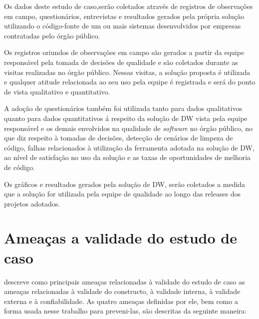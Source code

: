 Os dados deste estudo de caso,serão coletados através de registros de observações em campo, questionários, entrevistas e resultados gerados pela própria solução utilizando o código-fonte de um ou mais sistemas desenvolvidos por empresas contratadas pelo órgão público.

Os registros oriundos de observações em campo são gerados a partir da equipe responsável pela tomada de decisões de qualidade e são coletados durante as visitas realizadas no órgão público. Nessas visitas, a solução proposta é utilizada e qualquer atitude relacionada ao seu uso pela equipe é registrada e será do ponto de vista qualitativo e quantitativo.

A adoção de questionários também foi utilizada tanto para dados qualitativos quanto para dados quantitativos á respeito da solução de DW vista pela equipe responsável e os demais envolvidos na qualidade de \textit{software} no órgão público, no que diz respeito à tomadas de decisões, detecção de cenários de limpeza de código, falhas relacionados à utilização da ferramenta adotada na solução de DW, ao nível de satisfação no uso da solução e as taxas de oportunidades de melhoria de código. 

Os gráficos e resultados gerados pela solução de DW, serão coletados a medida que a solução for utilizada pela equipe de qualidade ao longo das releases dos projetos adotados.

\section{Ameaças a validade do estudo de caso}

 descreve como principais ameaças relacionadas à validade do estudo de caso as ameaças relacionadas à validade do constructo, à validade interna, à validade externa e à confiabilidade. As quatro ameaças definidas por ele, bem como a forma usada nesse trabalho para preveni-las, são descritas da seguinte maneira: 

